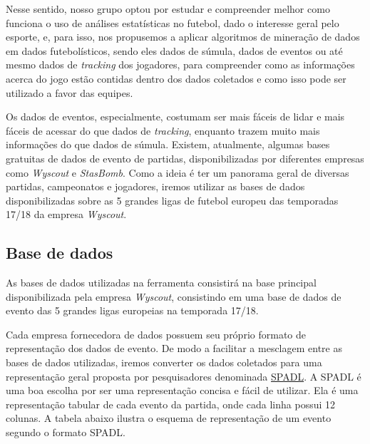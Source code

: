 \documentclass{article}
\begin{document}
Nesse sentido, nosso grupo optou por estudar e compreender melhor como funciona
o uso de análises estatísticas no futebol, dado o interesse geral pelo esporte,
e, para isso, nos propusemos a aplicar algoritmos de mineração de dados em
dados futebolísticos, sendo eles dados de súmula, dados de eventos ou até mesmo
dados de
\textit{tracking} dos jogadores, para compreender como as informações acerca do
jogo estão contidas dentro dos dados coletados e como isso pode ser utilizado a
favor das equipes.

Os dados de eventos, especialmente, costumam ser mais fáceis de lidar e mais
fáceis de acessar do que dados de \textit{tracking}, enquanto trazem muito mais
informações do que dados de súmula. Existem, atualmente, algumas bases
gratuitas de dados de evento de partidas, disponibilizadas por diferentes
empresas como \textit{Wyscout} e \textit{StasBomb}. Como a ideia é ter um
panorama geral de diversas partidas, campeonatos e jogadores, iremos utilizar
as bases de dados disponibilizadas sobre as 5 grandes ligas de futebol europeu
das temporadas 17/18 da empresa \textit{Wyscout}.

\subsection{Base de dados}

As bases de dados utilizadas na ferramenta consistirá na base principal
disponibilizada pela empresa \textit{Wyscout},
consistindo em uma base de dados de evento das 5 grandes ligas europeias na
temporada 17/18.

Cada empresa fornecedora de dados possuem seu próprio formato de representação
dos dados de evento. De modo a facilitar a mesclagem entre as bases de dados
utilizadas, iremos converter os dados coletados para uma representação geral
proposta por pesquisadores denominada
\href{https://socceraction.readthedocs.io/en/latest/documentation/spadl/spadl.html}{SPADL}.
A SPADL é uma boa escolha por ser uma representação concisa e fácil de
utilizar. Ela é uma representação tabular de cada evento da partida, onde cada
linha possui 12 colunas. A tabela abaixo ilustra o esquema de representação de
um evento segundo o formato SPADL.
\end{document}
